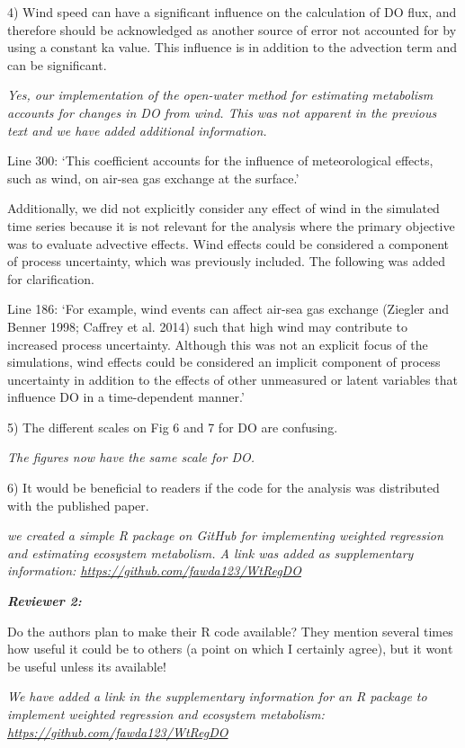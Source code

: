 \documentclass[letterpaper,12pt]{article}\usepackage[]{graphicx}\usepackage[]{color}
\newcommand{\Bigtxt}[1]{\textbf{\textit{#1}}}
\begin{document}
4) Wind speed can have a significant influence on the calculation of DO flux, and therefore should be acknowledged as another source of error not accounted for by using a constant ka value. This influence is in addition to the advection term and can be significant.

{\it Yes, our implementation of the open-water method for estimating metabolism accounts for changes in DO from wind.  This was not apparent in the previous text and we have added additional information.

Line 300: `This coefficient accounts for the influence of meteorological effects, such as wind, on air-sea gas exchange at the surface.'

Additionally, we did not explicitly consider any effect of wind in the simulated time series because it is not relevant for the analysis where the primary objective was to evaluate advective effects.  Wind effects could be considered a component of process uncertainty, which was previously included.  The following was added for clarification.

Line 186: `For example, wind events can affect air-sea gas exchange (Ziegler and Benner 1998; Caffrey et al. 2014) such that high wind may contribute to increased process uncertainty.  Although this was not an explicit focus of the simulations, wind effects could be considered an implicit component of process uncertainty in addition to the effects of other unmeasured or latent variables that influence DO in a time-dependent manner.'
}

5) The different scales on Fig 6 and 7 for DO are confusing. 

{\it The figures now have the same scale for DO.}

6) It would be beneficial to readers if the code for the analysis was distributed with the published paper.

{\it we created a simple R package on GitHub for implementing weighted regression and estimating ecosystem metabolism. A link was added as supplementary information: \href{https://github.com/fawda123/WtRegDO}{https://github.com/fawda123/WtRegDO}}  

\Bigtxt{Reviewer 2:}

Do the authors plan to make their R code available? They mention several times how useful it could be to others (a point on which I certainly agree), but it wont be useful unless its available!

{\it We have added a link in the supplementary information for an R package to implement weighted regression and ecosystem metabolism: \href{https://github.com/fawda123/WtRegDO}{https://github.com/fawda123/WtRegDO}}
\end{document}
